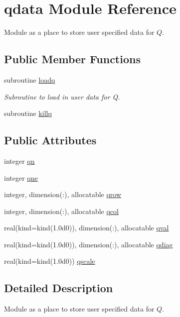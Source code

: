 \hypertarget{classqdata}{\section{qdata Module Reference}
\label{classqdata}
}


Module as a place to store user specified data for $Q$.  


\subsection*{Public Member Functions}
\begin{DoxyCompactItemize}
\item 
subroutine \hyperlink{classqdata_acbcbd8a57fcf9cfbe2bfe80cab5da8c7}{loadq}
\begin{DoxyCompactList}\small\item\em Subroutine to load in user data for Q. \end{DoxyCompactList}\item 
subroutine \hyperlink{classqdata_aa4128a7f7f1e66522023f38853743362}{killq}
\end{DoxyCompactItemize}
\subsection*{Public Attributes}
\begin{DoxyCompactItemize}
\item 
integer \hyperlink{classqdata_aa4944ce2e99ea3dcb54ea42d9b3f9a22}{qn}
\item 
integer \hyperlink{classqdata_ad8959a634c2f41f8b347e089c6a69dae}{qne}
\item 
integer, dimension(\-:), allocatable \hyperlink{classqdata_a2c604eee1d7b0a8fcd3a8e8432472b9e}{qrow}
\item 
integer, dimension(\-:), allocatable \hyperlink{classqdata_a5f6719033fda8397989e8d86c4947e53}{qcol}
\item 
real(kind=kind(1.\-0d0)), dimension(\-:), allocatable \hyperlink{classqdata_ae593212a134b4031c0919ae914716271}{qval}
\item 
real(kind=kind(1.\-0d0)), dimension(\-:), allocatable \hyperlink{classqdata_a545fd0353e6bc1b8e0b8a615966a4971}{qdiag}
\item 
real(kind=kind(1.\-0d0)) \hyperlink{classqdata_a6495174880a8b3a90015032bfd4cfc9c}{qscale}
\end{DoxyCompactItemize}


\subsection{Detailed Description}
Module as a place to store user specified data for $Q$. 


